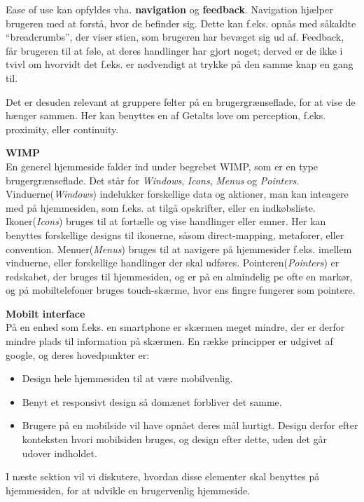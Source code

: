 Ease of use kan opfyldes vha. \textbf{navigation} og \textbf{feedback}.
Navigation hjælper brugeren med at forstå, hvor de befinder sig.
Dette kan f.eks. opnås med såkaldte ``breadcrumbs'', der viser stien, som brugeren har bevæget sig ud af.
Feedback, får brugeren til at føle, at deres handlinger har gjort noget; derved er de ikke i tvivl om hvorvidt det f.eks. er nødvendigt at trykke på den samme knap en gang til.

Det er desuden relevant at gruppere felter på en brugergrænseflade, for at vise de hænger sammen. 
Her kan benyttes en af Getalts love om perception, f.eks. proximity, eller continuity.\citep{DIS2014}

\textbf{WIMP}\hfill\\
En generel hjemmeside falder ind under begrebet WIMP, som er en type brugergrænseflade. Det står for \textit{Windows}, \textit{Icons}, \textit{Menus} og \textit{Pointers}.
Vinduerne(\textit{Windows}) indelukker forskellige data og aktioner, man kan inteagere med på hjemmesiden, som f.eks. at tilgå opskrifter, eller en indkøbsliste.
Ikoner(\textit{Icons}) bruges til at fortælle og vise handlinger eller emner.
Her kan benyttes forskellige designs til ikonerne, såsom direct-mapping, metaforer, eller convention.
Menuer(\textit{Menus}) bruges til at navigere på hjemmesider f.eks. imellem vinduerne, eller forskellige handlinger der skal udføres.
Pointeren(\textit{Pointers}) er redskabet, der bruges til hjemmesiden, og er på en almindelig pc ofte en markør, og på mobiltelefoner bruges touch-skærme, hvor ens fingre fungerer som pointere.


\textbf{Mobilt interface}\hfill\\
På en enhed som f.eks. en smartphone er skærmen meget mindre, der er derfor mindre plads til information på skærmen. 
En række principper er udgivet af google\citep{Mobil}, og deres hovedpunkter er:
\begin{itemize}[nolistsep,noitemsep]
	\item Design hele hjemmesiden til at være mobilvenlig.
	\item Benyt et responsivt design så domænet forbliver det samme.
	\item Brugere på en mobilside vil have opnået deres mål hurtigt. Design derfor efter konteksten hvori mobilsiden bruges, og design efter dette, uden det går udover indholdet.
\end{itemize}

I næste sektion vil vi diskutere, hvordan disse elementer skal benyttes på hjemmesiden, for at udvikle en brugervenlig hjemmeside.

